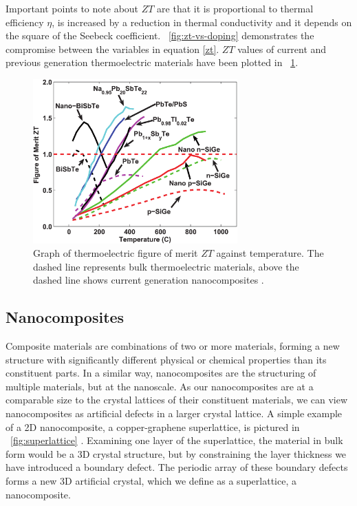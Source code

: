 \documentclass[12pt]{article}
\newcommand{\figref}[2][\figurename~]{#1\ref{#2}}
\begin{document}
Important points to note about $ZT$ are that it is proportional to thermal efficiency $\eta$, is increased by a reduction in thermal conductivity and it depends on the square of the Seebeck coefficient. \figref{fig:zt-vs-doping} demonstrates the compromise between the variables in equation \eqref{zt}. $ZT$ values of current and previous generation thermoelectric materials have been plotted in \figref{zt-plot}.

\begin{figure}
	\centering
	\includegraphics[width=0.7\textwidth]{zt-temp-plot.png}
	\caption{Graph of thermoelectric figure of merit $ZT$ against temperature. The dashed line represents bulk thermoelectric materials, above the dashed line shows current generation nanocomposites \cite{minnich-review}.}
	\label{zt-plot}
\end{figure}

\subsection{Nanocomposites}

Composite materials are combinations of two or more materials, forming a new structure with significantly different physical or chemical properties than its constituent parts. In a similar way, nanocomposites are the structuring of multiple materials, but at the nanoscale. As our nanocomposites are at a comparable size to the crystal lattices of their constituent materials, we can view nanocomposites as artificial defects in a larger crystal lattice. A simple example of a 2D nanocomposite, a copper-graphene superlattice, is pictured in \figref{fig:superlattice} . Examining one layer of the superlattice, the material in bulk form would be a 3D crystal structure, but by constraining the layer thickness we have introduced a boundary defect. The periodic array of these boundary defects forms a new 3D artificial crystal, which we define as a superlattice, a nanocomposite.
\end{document}
